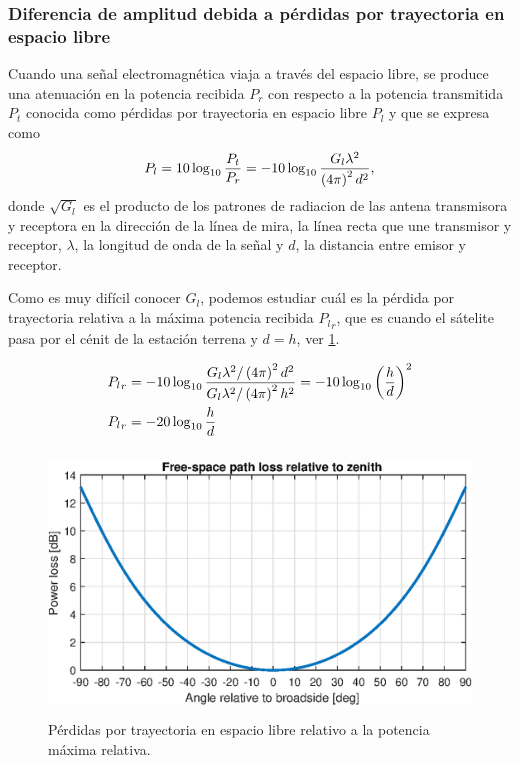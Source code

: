 \documentclass{article}
\newenvironment{standalone}{\begin{preview}}{\end{preview}}
\begin{document}
\begin{standalone}
  \subsubsection{Diferencia de amplitud debida a pérdidas por trayectoria en espacio libre}


  Cuando una señal electromagnética viaja a través del espacio libre, se produce una atenuación en la potencia recibida $P_r$ con respecto a la potencia transmitida $P_t$ conocida como pérdidas por trayectoria en espacio libre $P_l$ y que se expresa como \cite[29]{goldsmith2004}
  \begin{equation}
    P_l = 10 \log_{10}{ \frac{P_t}{P_r} } = -10 \log_{10}{ \frac{G_l \lambda^2}{\left( 4\pi \right)^2 d^2} },
    \tagaddtext{[\si{\decibel}]}
  \end{equation}
  donde $\sqrt{G_l}$ es el producto de los patrones de radiacion de las antena transmisora y receptora en la dirección de la línea de mira, la línea recta que une transmisor y receptor, $\lambda$, la longitud de onda de la señal y $d$, la distancia entre emisor y receptor.

  Como es muy difícil conocer $G_l$, podemos estudiar cuál es la pérdida por trayectoria relativa a la máxima potencia recibida ${P_l}_r$, que es cuando el sátelite pasa por el cénit de la estación terrena y $d = h$, ver \cref{fig:free-space-path-loss}.

  \begin{align}
    {P_l}_r &= -10 \log_{10}{ \frac{ G_l \lambda^2 / \left( 4\pi \right)^2 d^2 }{ G_l \lambda^2 / \left( 4\pi \right)^2 h^2 }} = - 10 \log_{10}{ \left( \frac{h}{d} \right)^2} \nonumber \\
    {P_l}_r &= -20 \log_{10}{\frac{h}{d}}
    \tagaddtext{[\si{\decibel}]}
  \end{align}

  \begin{figure}[!htbp]
    \centering
    \includegraphics[width=\linewidth, height=70mm, keepaspectratio]{../images/free-space-path-loss.eps}
    \caption{Pérdidas por trayectoria en espacio libre relativo a la potencia máxima relativa.}
    \label{fig:free-space-path-loss}
  \end{figure}


\end{standalone}
\end{document}
